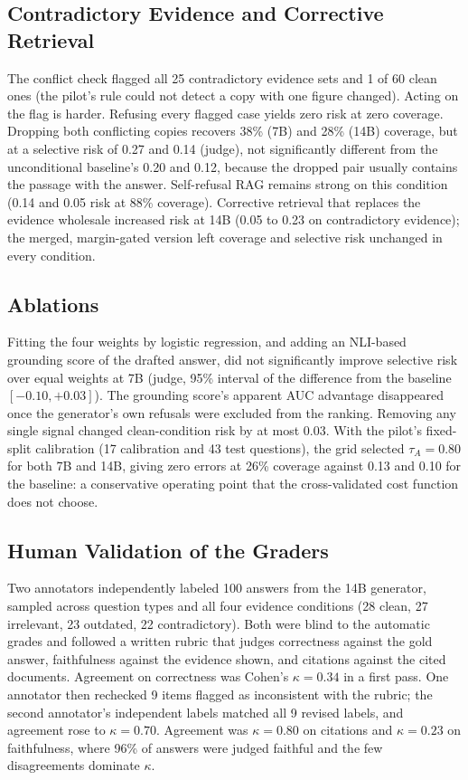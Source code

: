 \documentclass[conference,letterpaper]{IEEEtran}
\newcommand{\tA}{\tau_A}
\begin{document}
\subsection{Contradictory Evidence and Corrective Retrieval}
The conflict check flagged all 25 contradictory evidence sets and 1 of 60 clean ones (the
pilot's rule could not detect a copy with one figure changed). Acting on the flag is harder. Refusing every
flagged case yields zero risk at zero coverage. Dropping both conflicting copies recovers 38\% (7B)
and 28\% (14B) coverage, but at a selective risk of 0.27 and 0.14 (judge), not significantly
different from the unconditional baseline's 0.20 and 0.12, because the dropped pair usually
contains the passage with the answer. Self-refusal RAG remains strong on this condition (0.14 and
0.05 risk at 88\% coverage). Corrective retrieval that replaces the evidence wholesale increased
risk at 14B (0.05 to 0.23 on contradictory evidence); the merged, margin-gated version left coverage and
selective risk unchanged in every condition.

\subsection{Ablations}\label{sec:ablation}
Fitting the four weights by logistic regression, and adding an NLI-based grounding score of the
drafted answer, did not significantly improve selective risk over equal weights at 7B (judge,
95\% interval of the difference from the baseline $[-0.10,+0.03]$). The grounding score's
apparent AUC advantage disappeared once the generator's own refusals were excluded from the
ranking. Removing any single signal changed clean-condition risk by at most 0.03. With the
pilot's fixed-split calibration (17 calibration and 43 test questions), the grid selected
$\tA=0.80$ for both 7B and 14B, giving zero errors at 26\% coverage against 0.13 and 0.10 for the
baseline: a conservative operating point that the cross-validated cost function does not choose.

\subsection{Human Validation of the Graders}\label{sec:human}
Two annotators independently labeled 100 answers from the 14B generator, sampled across question
types and all four evidence conditions (28 clean, 27 irrelevant, 23 outdated, 22 contradictory).
Both were blind to the automatic grades and followed a written rubric
that judges correctness against the gold answer, faithfulness against the evidence shown, and
citations against the cited documents. Agreement on correctness was Cohen's $\kappa=0.34$ in a
first pass. One annotator then rechecked 9 items flagged as inconsistent with the rubric; the second annotator's
independent labels matched all 9 revised labels, and agreement rose to $\kappa=0.70$. Agreement
was $\kappa=0.80$ on citations and $\kappa=0.23$ on faithfulness, where 96\% of answers were
judged faithful and the few disagreements dominate $\kappa$.
\end{document}
